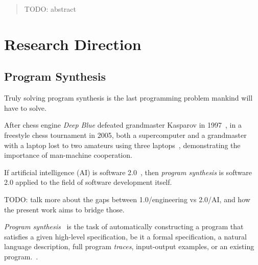 \documentclass{article}
\begin{document}


\tableofcontents

\pagebreak

\begin{abstract}
    TODO: abstract


\end{abstract}

\section{Research Direction} %

\subsection{Program Synthesis}

\epigraph{
    Truly solving program synthesis is the last programming problem mankind will have to solve.
}{
    \textit{\citet{nps}}
}

After chess engine \emph{Deep Blue} defeated grandmaster Kasparov in 1997~\citep{deepblue},
in a freestyle chess tournament in 2005,
both a supercomputer and a grandmaster with a laptop lost to two amateurs using three laptops~\citep{kasparov},
demonstrating the importance of man-machine cooperation.

\begin{displayquote}
    If artificial intelligence (AI) is software 2.0~\citep{software20},
    then \emph{program synthesis} is software 2.0 applied to the field of software development itself.
\end{displayquote}

TODO: talk more about the gaps between 1.0/engineering vs 2.0/AI, and how the present work aims to bridge those.

\emph{Program synthesis}~\citep{church1957applications} is the task of automatically constructing a program%
that satisfies a given high-level specification,
be it a formal specification, a natural language description,
full program \emph{traces}, input-output examples,
or an existing program.~\citep{gulwani2017program}.
\end{document}
